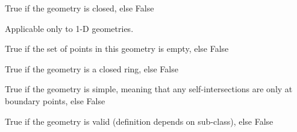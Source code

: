 \documentclass[letterpaper,10pt,english]{sphinxmanual}
\begin{document}
\begin{fulllineitems}
\begin{fulllineitems}
\end{fulllineitems}


\begin{fulllineitems}
\label{\detokenize{reference:taipanPyRouter.ESegment.is_closed}}
True if the geometry is closed, else False

Applicable only to 1-D geometries.

\end{fulllineitems}


\begin{fulllineitems}
\label{\detokenize{reference:taipanPyRouter.ESegment.is_empty}}
True if the set of points in this geometry is empty, else False

\end{fulllineitems}


\begin{fulllineitems}
\label{\detokenize{reference:taipanPyRouter.ESegment.is_ring}}
True if the geometry is a closed ring, else False

\end{fulllineitems}


\begin{fulllineitems}
\label{\detokenize{reference:taipanPyRouter.ESegment.is_simple}}
True if the geometry is simple, meaning that any self-intersections
are only at boundary points, else False

\end{fulllineitems}


\begin{fulllineitems}
\label{\detokenize{reference:taipanPyRouter.ESegment.is_valid}}
True if the geometry is valid (definition depends on sub-class),
else False

\end{fulllineitems}


\end{fulllineitems}
\end{document}
